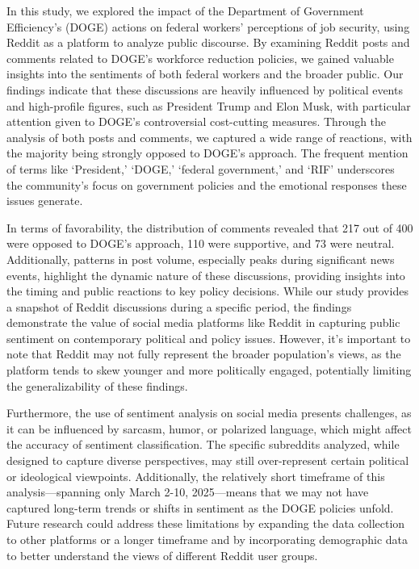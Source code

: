 \documentclass[
  12pt]{article}
\begin{document}
In this study, we explored the impact of the Department of Government
Efficiency's (DOGE) actions on federal workers' perceptions of job
security, using Reddit as a platform to analyze public discourse. By
examining Reddit posts and comments related to DOGE's workforce
reduction policies, we gained valuable insights into the sentiments of
both federal workers and the broader public. Our findings indicate that
these discussions are heavily influenced by political events and
high-profile figures, such as President Trump and Elon Musk, with
particular attention given to DOGE's controversial cost-cutting
measures. Through the analysis of both posts and comments, we captured a
wide range of reactions, with the majority being strongly opposed to
DOGE's approach. The frequent mention of terms like `President,' `DOGE,'
`federal government,' and `RIF' underscores the community's focus on
government policies and the emotional responses these issues generate.

In terms of favorability, the distribution of comments revealed that 217
out of 400 were opposed to DOGE's approach, 110 were supportive, and 73
were neutral. Additionally, patterns in post volume, especially peaks
during significant news events, highlight the dynamic nature of these
discussions, providing insights into the timing and public reactions to
key policy decisions. While our study provides a snapshot of Reddit
discussions during a specific period, the findings demonstrate the value
of social media platforms like Reddit in capturing public sentiment on
contemporary political and policy issues. However, it's important to
note that Reddit may not fully represent the broader population's views,
as the platform tends to skew younger and more politically engaged,
potentially limiting the generalizability of these findings.

Furthermore, the use of sentiment analysis on social media presents
challenges, as it can be influenced by sarcasm, humor, or polarized
language, which might affect the accuracy of sentiment classification.
The specific subreddits analyzed, while designed to capture diverse
perspectives, may still over-represent certain political or ideological
viewpoints. Additionally, the relatively short timeframe of this
analysis---spanning only March 2-10, 2025---means that we may not have
captured long-term trends or shifts in sentiment as the DOGE policies
unfold. Future research could address these limitations by expanding the
data collection to other platforms or a longer timeframe and by
incorporating demographic data to better understand the views of
different Reddit user groups.
\end{document}
